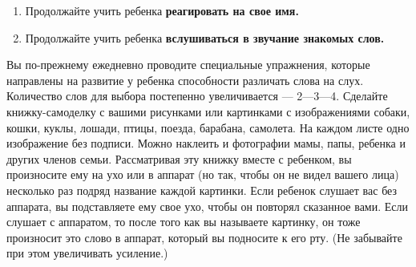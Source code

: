 \documentclass[a5paper]{book}
\begin{document}
\begin{enumerate}
\def\labelenumi{\arabic{enumi}.}
\setcounter{enumi}{2}
\item
  
  Продолжайте учить ребенка \textbf{реагировать на свое имя.}
  
\item
  
  Продолжайте учить ребенка \textbf{вслушиваться в звучание знакомых
  слов.}
  
\end{enumerate}


Вы по-прежнему ежедневно проводите специальные упражнения, которые
направлены на развитие у ребенка способности различать слова на слух.
Количество слов для выбора постепенно увеличивается --- 2---3---4.
Сделайте книжку-самоделку с вашими рисунками или картинками с
изображениями собаки, кошки, куклы, лошади, птицы, поезда, барабана,
самолета. На каждом листе одно изображение без подписи. Можно наклеить и
фотографии мамы, папы, ребенка и других членов семьи. Рассматривая эту
книжку вместе с ребенком, вы произносите ему на ухо или в аппарат (но
так, чтобы он не видел вашего лица) несколько раз подряд название каждой
картинки. Если ребенок слушает вас без аппарата, вы подставляете ему
свое ухо, чтобы он повторял сказанное вами. Если слушает с аппаратом, то
после того как вы называете картинку, он тоже произносит это слово в
аппарат, который вы подносите к его рту. (Не забывайте при этом
увеличивать усиление.)
\end{document}
